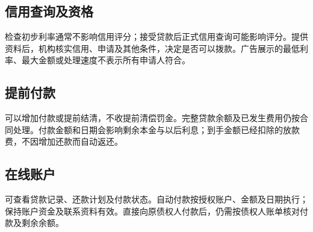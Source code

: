 \documentclass[UTF8,fontset=none,11pt,a4paper]{ctexart}
\begin{document}
\subsection*{信用查询及资格}
检查初步利率通常不影响信用评分；接受贷款后正式信用查询可能影响评分。提供资料后，机构核实信用、申请及其他条件，决定是否可以拨款。广告展示的最低利率、最大金额或处理速度不表示所有申请人符合。


\subsection*{提前付款}
可以增加付款或提前结清，不收提前清偿罚金。完整贷款余额及已发生费用仍按合同处理。付款金额和日期会影响剩余本金与以后利息；到手金额已经扣除的放款费，不因增加还款而自动返还。


\subsection*{在线账户}
可查看贷款记录、还款计划及付款状态。自动付款按授权账户、金额及日期执行；保持账户资金及联系资料有效。直接向原债权人付款后，仍需按债权人账单核对付款及剩余余额。
\end{document}
